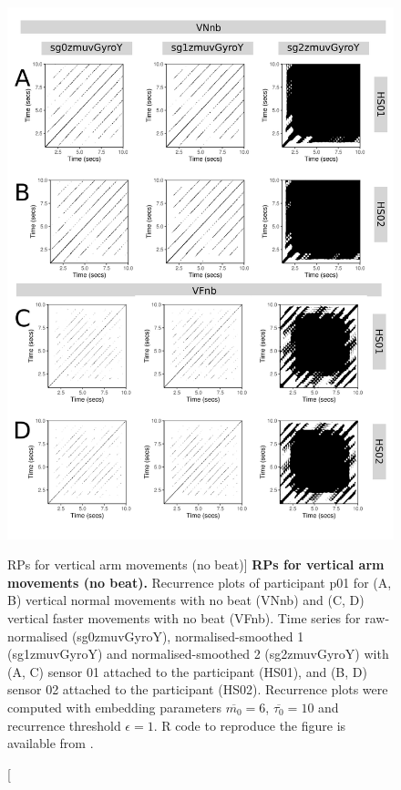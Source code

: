 \begin{figure}
\centering
\includegraphics[height=0.8\textheight]{fig_5_11}
\caption
	[RPs for vertical arm movements (no beat)]{
	{\bf RPs for vertical arm movements (no beat).}	
	Recurrence plots of participant p01 for 
	(A, B) vertical normal movements with no beat (VNnb) and
	(C, D) vertical faster movements with no beat (VFnb).
	Time series for raw-normalised (sg0zmuvGyroY), 
	normalised-smoothed 1 (sg1zmuvGyroY) and 
	normalised-smoothed 2 (sg2zmuvGyroY) with
	(A, C) sensor 01 attached to the participant (HS01), and
	(B, D) sensor 02 attached to the participant (HS02).
	Recurrence plots were computed with 
	embedding parameters $\overline{m_0}=6$, $\overline{\tau_0}=10$ and 
	recurrence threshold $\epsilon=1$.
	R code to reproduce the figure is available from \cite{xochicale2018}.
        }
    \label{fig:rps_Vnb_w500}
\end{figure}
